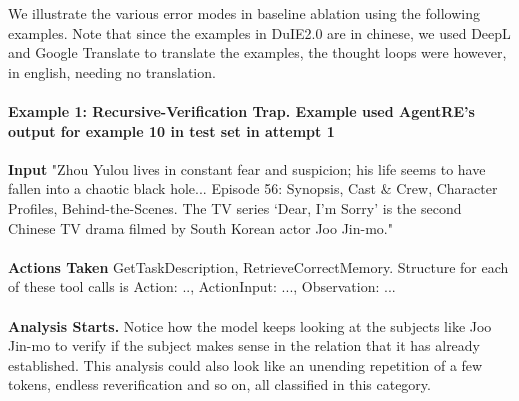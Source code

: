 We illustrate the various error modes in baseline ablation using the following
examples. Note that since the examples in DuIE2.0 are in chinese, we used DeepL and Google Translate to translate the examples, the thought loops were however, in english, needing no translation. 

\paragraph{Example 1: Recursive-Verification Trap. Example used AgentRE's output for example 10 in test set in attempt 1}

\textbf{Input} "Zhou Yulou lives in constant fear and suspicion; his life seems to have fallen into a chaotic black hole... Episode 56: Synopsis, Cast \& Crew, Character Profiles, Behind-the-Scenes. The TV series ‘Dear, I'm Sorry’ is the second Chinese TV drama filmed by South Korean actor Joo Jin-mo." \\ 
~\\
\textbf{Actions Taken} GetTaskDescription, RetrieveCorrectMemory. Structure for each of these tool calls is Action: .., ActionInput: ..., Observation: ... \\
~\\
\textbf{Analysis Starts.} Notice how the model keeps looking at the subjects like Joo Jin-mo to verify if the subject makes sense in the relation that it has already established. This analysis could also look like an unending repetition of a few tokens, endless reverification and so on, all classified in this category. 

